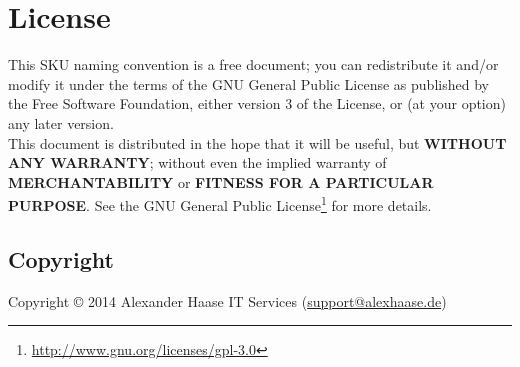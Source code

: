%
%
%
%
%
%
%

\section{License}

This SKU naming convention is a free document; you can redistribute it and/or
modify it under the terms of the GNU General Public License as published by the
Free Software Foundation, either version 3 of the License, or (at your option)
any later version. \\

This document is distributed in the hope that it will be useful, but
\textbf{WITHOUT ANY WARRANTY}; without even the implied warranty of
\textbf{MERCHANTABILITY} or \textbf{FITNESS FOR A PARTICULAR PURPOSE}. See the
GNU General Public License\footnote{\url{http://www.gnu.org/licenses/gpl-3.0}}
for more details. \\



\subsection{Copyright}

Copyright \copyright{}   2014 Alexander Haase IT Services
	(\href{mailto:support@alexhaase.de}{support@alexhaase.de})
